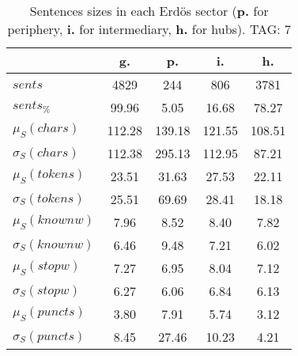 \begin{table}[h!]
\begin{center}
\begin{tabular}{| l | c | c | c | c |}\hline
 & g. & p. & i. & h. \\\hline
$sents$ & 4829  & 244  & 806  & 3781 \\\hline
$sents_{\%}$ & 99.96  & 5.05  & 16.68  & 78.27 \\\hline
$\mu_S(chars)$ & 112.28  & 139.18  & 121.55  & 108.51 \\\hline
$\sigma_S(chars)$ & 112.38  & 295.13  & 112.95  & 87.21 \\\hline
$\mu_S(tokens)$ & 23.51  & 31.63  & 27.53  & 22.11 \\\hline
$\sigma_S(tokens)$ & 25.51  & 69.69  & 28.41  & 18.18 \\\hline
$\mu_S(knownw)$ & 7.96  & 8.52  & 8.40  & 7.82 \\\hline
$\sigma_S(knownw)$ & 6.46  & 9.48  & 7.21  & 6.02 \\\hline
$\mu_S(stopw)$ & 7.27  & 6.95  & 8.04  & 7.12 \\\hline
$\sigma_S(stopw)$ & 6.27  & 6.06  & 6.84  & 6.13 \\\hline
$\mu_S(puncts)$ & 3.80  & 7.91  & 5.74  & 3.12 \\\hline
$\sigma_S(puncts)$ & 8.45  & 27.46  & 10.23  & 4.21 \\\hline
\end{tabular}
\caption{Sentences sizes in each Erd\"os sector ({{\bf p.}} for periphery, {{\bf i.}} for intermediary, {{\bf h.}} for hubs). TAG: 7}
\end{center}
\end{table}